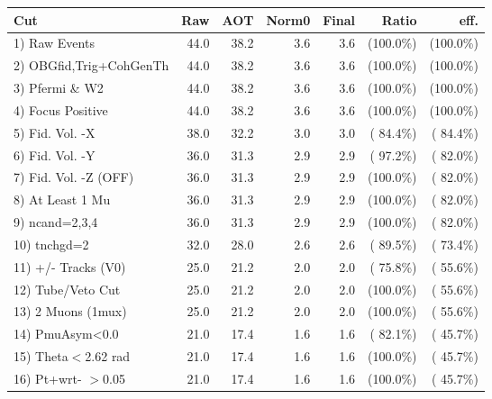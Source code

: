  \begin{table}[h!]\centering
 \begin{tabular}{||l||r|r|r|r|r|r||}
 \hline
 \hline
 Cut & Raw & AOT & Norm0 & Final & Ratio & eff.       \\
 \hline
  1) Raw Events           &         44.0 &         38.2 &          3.6 &          3.6 & (100.0\%) & (100.0\%) \\
  2) OBGfid,Trig+CohGenTh &         44.0 &         38.2 &          3.6 &          3.6 & (100.0\%) & (100.0\%) \\
  3) Pfermi \& W2         &         44.0 &         38.2 &          3.6 &          3.6 & (100.0\%) & (100.0\%) \\
  4) Focus Positive       &         44.0 &         38.2 &          3.6 &          3.6 & (100.0\%) & (100.0\%) \\
  5) Fid. Vol. -X         &         38.0 &         32.2 &          3.0 &          3.0 & ( 84.4\%) & ( 84.4\%) \\
  6) Fid. Vol. -Y         &         36.0 &         31.3 &          2.9 &          2.9 & ( 97.2\%) & ( 82.0\%) \\
  7) Fid. Vol. -Z (OFF)   &         36.0 &         31.3 &          2.9 &          2.9 & (100.0\%) & ( 82.0\%) \\
  8) At Least 1 Mu        &         36.0 &         31.3 &          2.9 &          2.9 & (100.0\%) & ( 82.0\%) \\
  9) ncand=2,3,4          &         36.0 &         31.3 &          2.9 &          2.9 & (100.0\%) & ( 82.0\%) \\
 10) tnchgd=2             &         32.0 &         28.0 &          2.6 &          2.6 & ( 89.5\%) & ( 73.4\%) \\
 11) +/- Tracks (V0)      &         25.0 &         21.2 &          2.0 &          2.0 & ( 75.8\%) & ( 55.6\%) \\
 12) Tube/Veto Cut        &         25.0 &         21.2 &          2.0 &          2.0 & (100.0\%) & ( 55.6\%) \\
 13) 2 Muons (1mux)       &         25.0 &         21.2 &          2.0 &          2.0 & (100.0\%) & ( 55.6\%) \\
 14) PmuAsym<0.0          &         21.0 &         17.4 &          1.6 &          1.6 & ( 82.1\%) & ( 45.7\%) \\
 15) Theta$<$2.62 rad     &         21.0 &         17.4 &          1.6 &          1.6 & (100.0\%) & ( 45.7\%) \\
 16) Pt+wrt- $>$0.05      &         21.0 &         17.4 &          1.6 &          1.6 & (100.0\%) & ( 45.7\%) \\

\end{tabular}
\end{table}
